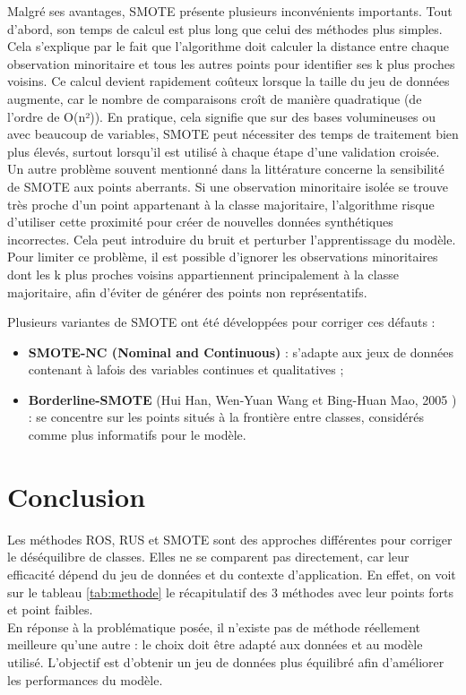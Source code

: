 \documentclass{article}
\begin{document}
Malgré ses avantages, SMOTE présente plusieurs inconvénients importants. Tout d’abord, son temps de calcul est plus long que celui des méthodes plus simples. Cela s’explique par le fait que l’algorithme doit calculer la distance
entre chaque observation minoritaire et tous les autres points pour identifier ses k plus proches voisins. Ce calcul devient rapidement coûteux lorsque la taille du jeu de données augmente, car le nombre de comparaisons croît de manière quadratique (de l’ordre de O(n²)). En pratique, cela signifie que sur des bases volumineuses ou avec beaucoup de variables, SMOTE peut nécessiter des temps de traitement bien plus élevés,
surtout lorsqu’il est utilisé à chaque étape d’une validation croisée.
Un autre problème souvent mentionné dans la littérature concerne la sensibilité de SMOTE aux points aberrants. Si une observation minoritaire isolée se trouve très proche d’un point appartenant à la classe majoritaire, l’algorithme risque d’utiliser cette proximité
pour créer de nouvelles données synthétiques incorrectes. Cela peut introduire du bruit et perturber l’apprentissage du modèle. Pour limiter ce problème, il est possible d’ignorer les observations minoritaires dont les k plus proches voisins appartiennent principalement
à la classe majoritaire, afin d’éviter de générer des points non représentatifs.\medskip


Plusieurs variantes de SMOTE ont été développées pour corriger ces défauts :
\begin{itemize}
    \item \textbf{SMOTE-NC (Nominal and Continuous)} : s’adapte aux jeux de données contenant à lafois des variables continues et qualitatives ;
    \item \textbf{Borderline-SMOTE} (Hui Han, Wen-Yuan Wang et Bing-Huan Mao, 2005 ) : se concentre sur les points situés à la frontière entre classes, considérés comme plus informatifs pour le modèle.
\end{itemize}

\section{Conclusion}

Les méthodes ROS, RUS et SMOTE sont des approches différentes pour corriger le déséquilibre de classes. Elles ne se comparent pas directement, car leur efficacité dépend du jeu de données et du contexte d’application.
En effet, on voit sur le tableau \ref{tab:methode} le récapitulatif des 3 méthodes avec leur points forts et point faibles. \\
En réponse à la problématique posée, il n’existe pas de méthode réellement meilleure qu'une autre : le choix doit être adapté aux données et au modèle utilisé.
L’objectif est d’obtenir un jeu de données plus équilibré afin d’améliorer les performances du modèle.\\
\end{document}
